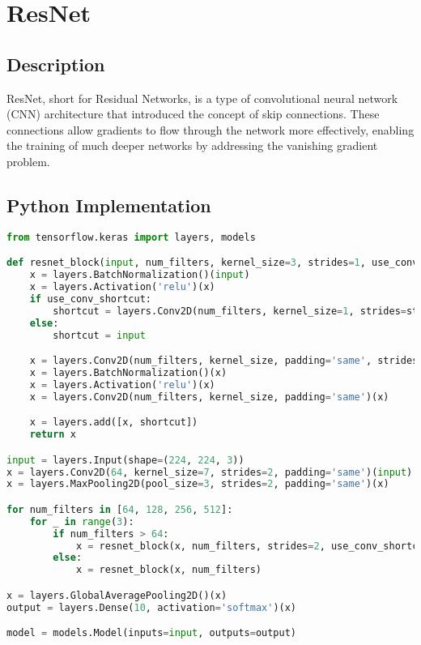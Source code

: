 \chapter{ResNet}

\section{Description}
ResNet, short for Residual Networks, is a type of convolutional neural network (CNN) architecture that introduced the concept of skip connections. These connections allow gradients to flow through the network more effectively, enabling the training of much deeper networks by addressing the vanishing gradient problem.

\section{Python Implementation}
\begin{lstlisting}[language=Python]
from tensorflow.keras import layers, models

def resnet_block(input, num_filters, kernel_size=3, strides=1, use_conv_shortcut=False):
    x = layers.BatchNormalization()(input)
    x = layers.Activation('relu')(x)
    if use_conv_shortcut:
        shortcut = layers.Conv2D(num_filters, kernel_size=1, strides=strides)(input)
    else:
        shortcut = input

    x = layers.Conv2D(num_filters, kernel_size, padding='same', strides=strides)(x)
    x = layers.BatchNormalization()(x)
    x = layers.Activation('relu')(x)
    x = layers.Conv2D(num_filters, kernel_size, padding='same')(x)

    x = layers.add([x, shortcut])
    return x

input = layers.Input(shape=(224, 224, 3))
x = layers.Conv2D(64, kernel_size=7, strides=2, padding='same')(input)
x = layers.MaxPooling2D(pool_size=3, strides=2, padding='same')(x)

for num_filters in [64, 128, 256, 512]:
    for _ in range(3):
        if num_filters > 64:
            x = resnet_block(x, num_filters, strides=2, use_conv_shortcut=True)
        else:
            x = resnet_block(x, num_filters)

x = layers.GlobalAveragePooling2D()(x)
output = layers.Dense(10, activation='softmax')(x)

model = models.Model(inputs=input, outputs=output)
\end{lstlisting}

